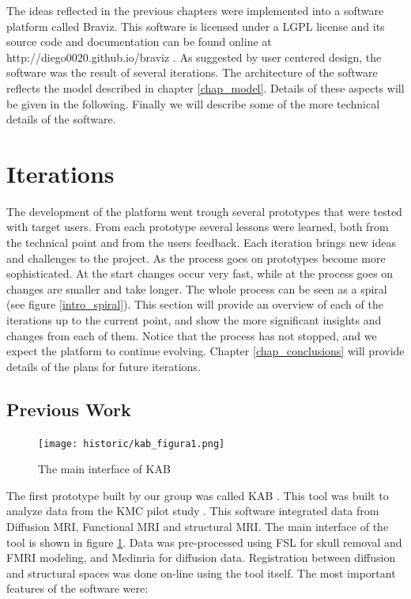 
The ideas reflected in the previous chapters were implemented into a software platform called Braviz. This software is licensed under a LGPL license and its source code and documentation can be found online at http://diego0020.github.io/braviz . As suggested by user centered design, the software was the result of several iterations. The architecture of the software reflects the model described in chapter \ref{chap_model}. Details of these aspects will be given in the following. Finally we will describe some of the more technical details of the software.

\section{Iterations}




The development of the platform went trough several prototypes that were tested with target users. From each prototype several lessons were learned, both from the technical point and from the users feedback. Each iteration brings new ideas and challenges to the project. As the process goes on prototypes become more sophisticated. At the start changes occur very fast, while at the process goes on changes are smaller and take longer. The whole process can be seen as a spiral (see figure \ref{intro_spiral}). This section will provide an overview of each of the iterations up to the current point, and show the more significant insights and changes from each of them. Notice that the process has not stopped, and we expect the platform to continue evolving. Chapter \ref{chap_conclusions} will provide details of the plans for future iterations.

\subsection{Previous Work}
\label{sec_kab}
\begin{figure}
\centering
\texttt{[image: historic/kab\_figura1.png]} 
\caption{\label{fig_kab}The main interface of KAB}
\end{figure}

The first prototype built by our group was called KAB \autocite{castro_kab:_2012}. This tool was built to analyze data from the KMC pilot study \autocite{schneider_cerebral_2012}. This software integrated data from Diffusion MRI, Functional MRI and structural MRI. The main interface of the tool is shown in figure \ref{fig_kab}. Data was pre-processed using FSL \autocite{jenkinson_fsl_2012} for skull removal and FMRI modeling, and Medinria \autocite{toussaint_medinria:_2007} for diffusion data. Registration between diffusion and structural spaces was done on-line using the tool itself. The most important features of the software were:

